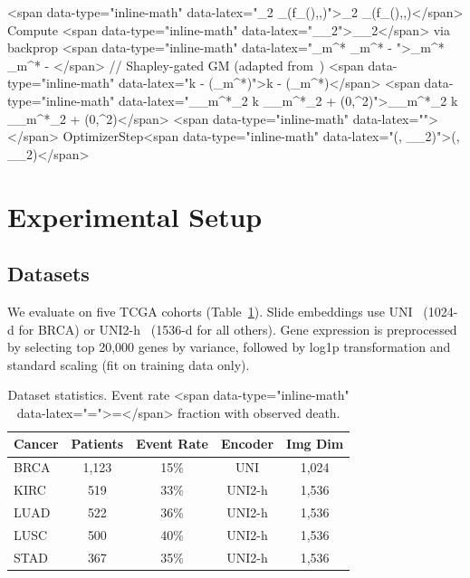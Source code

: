 \documentclass[10pt]{article}\usepackage[utf8]{inputenc}\usepackage[T1]{fontenc}\usepackage{amsmath,amssymb,amsfonts,bm}\usepackage{booktabs}\usepackage{multirow}\usepackage{array}\usepackage{graphicx}\usepackage{algorithm}\usepackage{algorithmic}\usepackage{xcolor}\usepackage[margin=1in]{geometry}\usepackage{microtype}
\begin{document}
\begin{algorithm}[t]
\begin{algorithmic}
\STATE <span data-type="inline-math" data-latex="_2 \leftarrow {}_{}(f_\theta(),,\boldsymbol{\delta})">_2 \leftarrow {}_{}(f_\theta(),,\boldsymbol{\delta})</span>
\STATE Compute <span data-type="inline-math" data-latex="\nabla_\theta {}_2">\nabla_\theta {}_2</span> via backprop
\STATE <span data-type="inline-math" data-latex="\theta_{m^*} \leftarrow \theta_{m^*} - \boldsymbol{\epsilon}">\theta_{m^*} \leftarrow \theta_{m^*} - \boldsymbol{\epsilon}</span> 
\STATE // Shapley-gated GM (adapted from~\cite{peng2022balanced})
\STATE <span data-type="inline-math" data-latex="k  - \tanh(\alpha \cdot \phi_{m^*})">k  - \tanh(\alpha \cdot \phi_{m^*})</span>
\STATE <span data-type="inline-math" data-latex="\nabla_{\theta_{m^*}}_2 \leftarrow k \cdot \nabla_{\theta_{m^*}}_2 + (0,\sigma^2)">\nabla_{\theta_{m^*}}_2 \leftarrow k \cdot \nabla_{\theta_{m^*}}_2 + (0,\sigma^2)</span>
\STATE <span data-type="inline-math" data-latex="\theta \leftarrow">\theta \leftarrow</span> OptimizerStep<span data-type="inline-math" data-latex="(\theta, \nabla_\theta {}_2)">(\theta, \nabla_\theta {}_2)</span>
\end{algorithmic}
\end{algorithm}

\section{Experimental Setup}\label{sec:exp}
\subsection{Datasets}
We evaluate on five TCGA cohorts (Table~\ref{tab:datasets}). Slide embeddings use UNI~\cite{chen2024path} (1024-d for BRCA) or UNI2-h~\cite{vorontsov2024uni,lu2024path} (1536-d for all others). Gene expression is preprocessed by selecting top 20{,}000 genes by variance, followed by log1p transformation and standard scaling (fit on training data only).

\begin{table}[t]\centering\small
\caption{Dataset statistics. Event rate <span data-type="inline-math" data-latex="=">=</span> fraction with observed death.}\label{tab:datasets}
\begin{tabular}{lcccc}\toprule
Cancer & Patients & Event Rate & Encoder & Img Dim \\\midrule
BRCA & 1{,}123 & 15\% & UNI & 1{,}024 \\
KIRC & 519 & 33\% & UNI2-h & 1{,}536 \\
LUAD & 522 & 36\% & UNI2-h & 1{,}536 \\
LUSC & 500 & 40\% & UNI2-h & 1{,}536 \\
STAD & 367 & 35\% & UNI2-h & 1{,}536 \\\bottomrule
\end{tabular}
\end{table}
\end{document}
